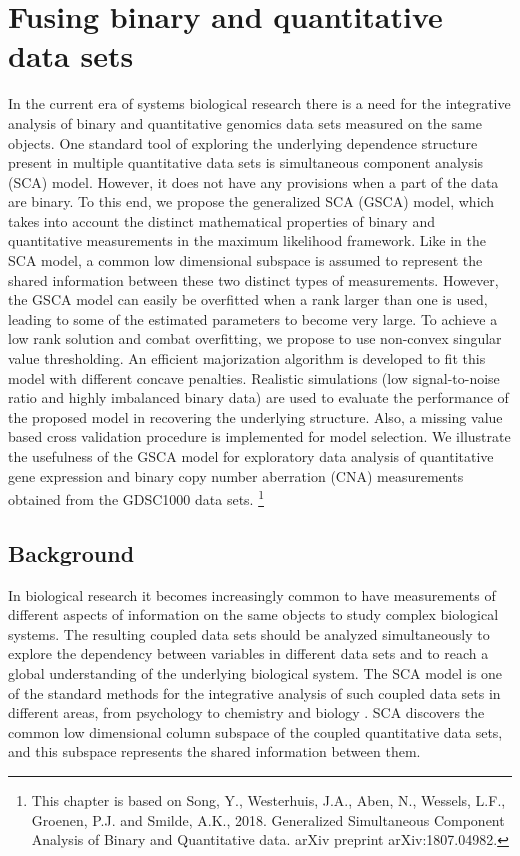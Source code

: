 \chapter{Fusing binary and quantitative data sets} \label{chapter:4}
In the current era of systems biological research there is a need for the integrative analysis of binary and quantitative genomics data sets measured on the same objects. One standard tool of exploring the underlying dependence structure present in multiple quantitative data sets is simultaneous component analysis (SCA) model. However, it does not have any provisions when a part of the data are binary. To this end, we propose the generalized SCA (GSCA) model, which takes into account the distinct mathematical properties of binary and quantitative measurements in the maximum likelihood framework. Like in the SCA model, a common low dimensional subspace is assumed to represent the shared information between these two distinct types of measurements. However, the GSCA model can easily be overfitted when a rank larger than one is used, leading to some of the estimated parameters to become very large. To achieve a low rank solution and combat overfitting, we propose to use non-convex singular value thresholding. An efficient majorization algorithm is developed to fit this model with different concave penalties. Realistic simulations (low signal-to-noise ratio and highly imbalanced binary data) are used to evaluate the performance of the proposed model in recovering the underlying structure. Also, a missing value based cross validation procedure is implemented for model selection. We illustrate the usefulness of the GSCA model for exploratory data analysis of quantitative gene expression and binary copy number aberration (CNA) measurements obtained from the GDSC1000 data sets.
\footnote{This chapter is based on Song, Y., Westerhuis, J.A., Aben, N., Wessels, L.F., Groenen, P.J. and Smilde, A.K., 2018. Generalized Simultaneous Component Analysis of Binary and Quantitative data. arXiv preprint arXiv:1807.04982.}

\section{Background} \label{section:4.1}
In biological research it becomes increasingly common to have measurements of different aspects of information on the same objects to study complex biological systems. The resulting coupled data sets should be analyzed simultaneously to explore the dependency between variables in different data sets and to reach a global understanding of the underlying biological system. The SCA model is one of the standard methods for the integrative analysis of such coupled data sets in different areas, from psychology to chemistry and biology \cite{van2009structured}. SCA discovers the common low dimensional column subspace of the coupled quantitative data sets, and this subspace represents the shared information between them.

